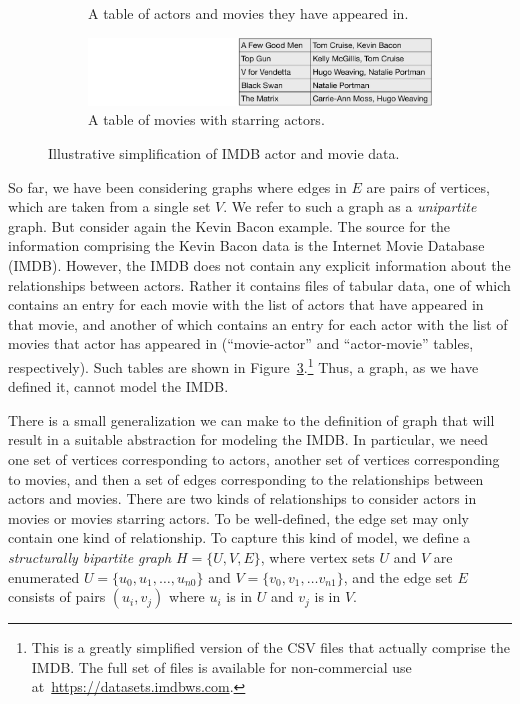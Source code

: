 \begin{figure}[ht]
\begin{subfigure}[t]{0.3\textwidth}
    \caption{\label{fig:actor-movie-table}
    A table of actors and movies they have appeared in.}
  \end{subfigure}
\hspace{1em}
       \begin{subfigure}[t]{0.3\textwidth}
    \small
    \centering
    \includegraphics[width=0.9\linewidth]{figs/movie-actor-table.pdf}
    \caption{\label{fig:movie-actor-table}
    A table of movies with starring actors.}
  \end{subfigure}
  \caption{Illustrative simplification of IMDB actor and movie data.\label{fig:imdb}}

\end{figure}

So far, we have been considering graphs where 
edges in $E$ are pairs of vertices, which are taken from a single set $V$.
%
We refer to such a graph as a \emph{unipartite} graph.
%
But consider again the Kevin Bacon example.  The source for the information comprising the Kevin Bacon data is the Internet Movie Database (IMDB).  
However, the IMDB does not contain any explicit information about the relationships between actors.  
%
Rather it contains files of tabular data, one of which contains an entry for each movie with the list of actors that have appeared in that movie,
and another of which contains an entry for each actor with the list of movies that actor has
appeared in (``movie-actor'' and ``actor-movie'' tables, respectively).  Such tables are shown in Figure~\ref{fig:imdb}.\footnote{This is a greatly simplified version of the CSV files that actually comprise the IMDB.  The full set of files is available for non-commercial use at~\url{https://datasets.imdbws.com}.}
%
Thus, a graph, as we have defined it, cannot model the IMDB.  

There is a small generalization we can make to the definition of graph that will result in a suitable abstraction for modeling the IMDB.  In particular, we need one set of vertices corresponding to actors, another set of vertices corresponding to movies, and then a set of edges corresponding to the relationships between actors and movies.  There are two kinds of relationships to consider actors in movies or movies starring actors.  To be well-defined, the edge set may only contain one kind of relationship.  To capture this kind of model, we define a \emph{structurally bipartite graph} $H = \{ U, V, E \}$, where vertex sets $U$ and $V$ are enumerated $U = \{ u_0, u_1, \ldots , u_{n0} \}$ and $V  = \{ v_0, v_1, \ldots v_{n1}\}$, 
and the edge set $E$ consists of pairs $(u_i, v_j)$ where $u_i$ is in $U$ and $v_j$ is in $V$.

